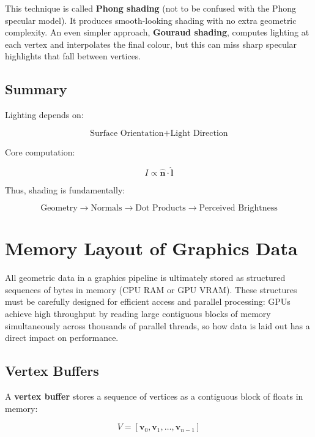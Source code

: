 \documentclass[11pt]{article}
\begin{document}
This technique is called \textbf{Phong shading} (not to be confused with the Phong specular model). It produces smooth-looking shading with no extra geometric complexity. An even simpler approach, \textbf{Gouraud shading}, computes lighting at each vertex and interpolates the final colour, but this can miss sharp specular highlights that fall between vertices.


\subsection{Summary}

Lighting depends on:

\begin{equation}
    \text{Surface Orientation} + \text{Light Direction}
\end{equation}

Core computation:

\begin{equation}
    I \propto \hat{\mathbf{n}} \cdot \hat{\mathbf{l}}
\end{equation}

Thus, shading is fundamentally:

\begin{equation}
    \text{Geometry} \rightarrow \text{Normals} \rightarrow \text{Dot Products} \rightarrow \text{Perceived Brightness}
\end{equation}

\section{Memory Layout of Graphics Data}

All geometric data in a graphics pipeline is ultimately stored as structured sequences of bytes in memory (CPU RAM or GPU VRAM). These structures must be carefully designed for efficient access and parallel processing: GPUs achieve high throughput by reading large contiguous blocks of memory simultaneously across thousands of parallel threads, so how data is laid out has a direct impact on performance.

\subsection{Vertex Buffers}

A \textbf{vertex buffer} stores a sequence of vertices as a contiguous block of floats in memory:

\begin{equation}
    V = [\mathbf{v}_0, \mathbf{v}_1, \dots, \mathbf{v}_{n-1}]
\end{equation}
\end{document}
